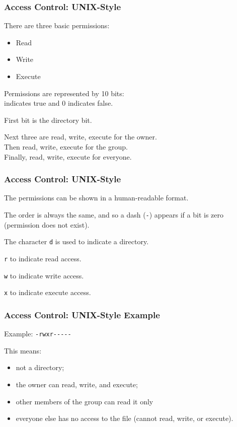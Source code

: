 \begin{frame}
\frametitle{Access Control: UNIX-Style}
\begin{changemargin}{1cm}

There are three basic permissions: 

\begin{itemize}
	\item Read
	\item Write
	\item Execute
\end{itemize}

Permissions are represented by 10 bits:\\ 
 indicates true and 0 indicates false.

First bit is the directory bit.

Next three are read, write, execute for the owner.\\
Then read, write, execute for the group.\\
Finally, read, write, execute for everyone.

\end{changemargin}
\end{frame}

\begin{frame}
\frametitle{Access Control: UNIX-Style}
\begin{changemargin}{1cm}

The permissions can be shown in a human-readable format.

The order is always the same, and so a dash (\texttt{-}) appears if a bit is zero (permission does not exist). 

The character \texttt{d} is used to indicate a directory.

\texttt{r} to indicate read access.

\texttt{w} to indicate write access.

\texttt{x} to indicate execute access.


\end{changemargin}
\end{frame}

\begin{frame}
\frametitle{Access Control: UNIX-Style Example}
\begin{changemargin}{1cm}

Example: \texttt{-rwxr{-}{-}{-}{-}{-}} 

This means:
\begin{itemize}
\item not a directory; 
\item the owner can read, write, and execute; 
\item other members of the group can read it only
\item everyone else has no access to the file (cannot read, write, or execute).
\end{itemize}

\end{changemargin}
\end{frame}

